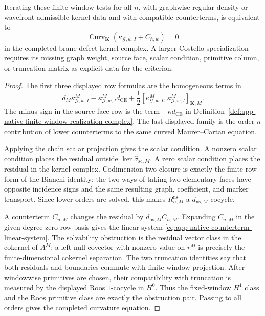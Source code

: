 \begin{thm}
  Iterating these finite-window tests for all \(n\), with graphwise
  regular-density or wavefront-admissible kernel data and with compatible
  counterterms, is equivalent to
  \[
    \operatorname{Curv}_{\mathbf K}
      (\kappa_{\mathcal G,w,I}+C_{\hbar,w})=0
  \]
  in the completed brane-defect kernel complex.  A larger
  Costello specialization requires its missing graph weight, source
  face, scalar condition, primitive column, or truncation matrix
  as explicit data for the criterion.
\end{thm}

\begin{proof}
  The first three displayed row formulas are the homogeneous terms in
  \[
    d_M\kappa^M_{\mathcal G,w,I}
      -\kappa^M_{\mathcal G,w,I}d_{\mathrm{CE}}
      +\frac12[\kappa^M_{\mathcal G,w,I},
               \kappa^M_{\mathcal G,w,I}]_{\mathbf K,M}.
  \]
  The minus sign in the source-face row is the term
  \(-\kappa d_{\mathrm{CE}}\) in
  Definition~\ref{def:app-native-finite-window-realization-complex}.  The
  last displayed family is the order-\(n\) contribution of lower
  counterterms to the same curved Maurer--Cartan equation.

  Applying the chain scalar projection gives the scalar condition.  A
  nonzero scalar condition places the residual outside
  \(\ker\widehat\sigma_{\mathrm{sc},M}\).  A zero scalar condition places the
  residual in the kernel complex.  Codimension-two closure is exactly
  the finite-row form of the Bianchi identity: the two ways of taking two
  elementary faces have opposite incidence signs and the same resulting graph,
  coefficient, and marker transport.  Since lower orders are solved, this
  makes \(R^{\mathrm{ns}}_{n,M}\) a \(d_{\mathrm{ns},M}\)-cocycle.

  A counterterm \(C_{n,M}\) changes the residual by
  \(d_{\mathrm{ns},M}C_{n,M}\).  Expanding \(C_{n,M}\) in the given
  degree-zero row basis gives the linear system
  \eqref{eq:app-native-counterterm-linear-system}.  The solvability
  obstruction is the residual vector class in the cokernel of \(A^M\);
  a left-null covector with nonzero value on \(r^M\) is precisely the
  finite-dimensional cokernel separation.  The two truncation identities
  say that both residuals and boundaries commute with finite-window
  projection.  After windowwise primitives are chosen, their compatibility
  with truncation is measured by the displayed Roos \(1\)-cocycle in
  \(H^0\).  Thus the fixed-window \(H^1\) class and the Roos primitive
  class are exactly the obstruction pair.  Passing to all orders gives the
  completed curvature equation.
\end{proof}

